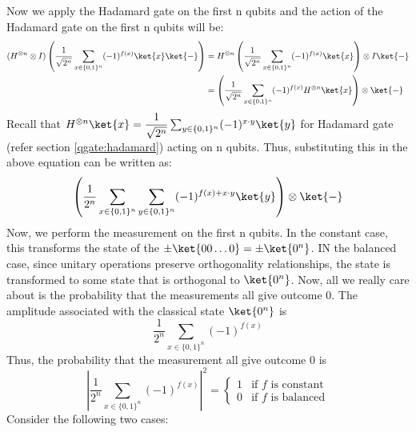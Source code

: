 \documentclass[12pt, oneside]{book}
\theoremstyle{definition}
\theoremstyle{definition}
\theoremstyle{remark}
\begin{document}
Now we apply the Hadamard gate on the first n qubits and the action of the Hadamard gate on the first n qubits will be:
\begin{align*}
    (H^{\otimes n}\otimes I)\left(\frac{1}{\sqrt{2^n}}\sum_{x \in \{0,1\}^n}(-1)^{f(x)}\ket{x}\ket{-}\right)&=H^{\otimes n}\left(\frac{1}{\sqrt{2^n}}\sum_{x \in \{0,1\}^n}(-1)^{f(x)}\ket{x}\right)\otimes I\ket{-}\\
    &=\left(\frac{1}{\sqrt{2^n}}\sum_{x \in \{0,1\}^n}(-1)^{f(x)}H^{\otimes n}\ket{x}\right)\otimes \ket{-}
\end{align*}
Recall that $H^{\otimes n}\ket{x}=\dfrac{1}{\sqrt{2^n}}\sum_{y \in \{0,1\}^n}(-1)^{x\cdot y}\ket{y}$ for Hadamard gate (refer section \ref{qgate:hadamard}) acting on n qubits. Thus, substituting this in the above equation can be written as:
\[
    \left(\frac{1}{2^n}\sum_{x \in \{0,1\}^n}\sum_{y \in \{0,1\}^n}(-1)^{f(x)+x\cdot y}\ket{y}\right)\otimes \ket{-}
\]
Now, we perform the measurement on the first n qubits. In the constant case, this transforms the state of the $\pm \ket{00\ldots 0}=\pm \ket{0^n}$. IN the balanced case, since unitary operations preserve orthogonality relationships, the state is transformed to some state that is orthogonal to $\ket{0^n}$. Now, all we really care about is the probability that the measurements all give outcome 0. The amplitude associated with the classical state $\ket{0^n}$ is
\[
\dfrac{1}{2^n}\sum_{x\in\{0,1\}^n} (-1)^{f(x)}
\]
Thus, the probability that the measurement all give outcome 0 is
\[ 
\left|\dfrac{1}{2^n} \sum_{x\in\{0,1\}^n}
(-1)^{f(x)}\right|^2=\begin{cases} 1 & \text{if $f$ is constant} \\ 0 & \text{if $f$ is balanced} \end{cases}
\]
Consider the following two cases:
\end{document}
